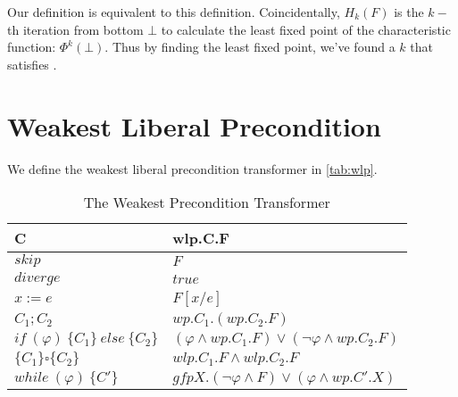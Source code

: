 Our definition is equivalent to this definition. 
Coincidentally, $H_k(F)$ is the $k-$th iteration from bottom $\bot$ to calculate the least fixed point of the characteristic function: $\Phi^k(\bot)$. 
Thus by finding the least fixed point, we've found a $k$ that satisfies . 

\section{Weakest Liberal Precondition}
We define the weakest liberal precondition transformer in \autoref{tab:wlp}. 
\begin{table}[h!]\centering
    \begin{tabular}{ll}
      \textbf{C}&\textbf{wlp.C.F}    \\ \hline
      $skip$&   $F$   \\
      $diverge$&  $true$\\
      $x:= e $&  $F[x/e]$\\
      $C_1;C_2$&  $wp.C_1.(wp.C_2.F)$\\
      $if\ (\varphi)\ \{C_1\}\ else\ \{C_2\} $&  $(\varphi\wedge wp.C_1.F)\vee(\neg\varphi\wedge wp.C_2.F)$\\
      $\{C_1\}\square \{C_2\}$ & $wlp.C_1.F\wedge wlp.C_2.F$\\
      $while\ (\varphi)\ \{C'\}$&  $gfp X.(\neg\varphi\wedge F)\vee(\varphi\wedge wp.C'.X)$\\
    \end{tabular}
    \caption{The Weakest Precondition Transformer}
    \label{tab:wlp}
\end{table}

